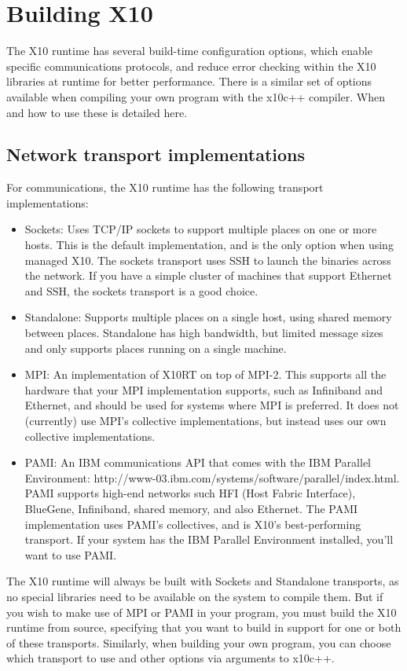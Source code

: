 \chapter{Building X10}
The X10 runtime has several build-time configuration options, which enable
specific communications protocols, and reduce error checking within the X10
libraries at runtime for better performance.  There is a similar set of options
available when compiling your own program with the x10c++ compiler.  When and
how to use these is detailed here.

\section{Network transport implementations}
For communications, the X10 runtime has the following transport
implementations:
\begin{itemize}
\item Sockets: Uses TCP/IP sockets to support multiple places on one or more
hosts.  This is the default implementation, and is the only option when using
managed X10.  The sockets transport uses SSH to launch the binaries across the
network.  If you have a simple cluster of machines that support Ethernet and
SSH, the sockets transport is a good choice.
\item Standalone: Supports multiple places on a single host, using shared
memory between places. Standalone has high bandwidth, but limited message sizes
and only supports places running on a single machine.
\item MPI: An implementation of X10RT on top of MPI-2. This supports all the
hardware that your MPI implementation supports, such as Infiniband and
Ethernet, and should be used for systems where MPI is preferred.  It does not
(currently) use MPI's collective implementations, but instead uses our own
collective implementations.
\item PAMI: An IBM communications API that comes with the IBM Parallel
Environment: http://www-03.ibm.com/systems/software/parallel/index.html.  PAMI
supports high-end networks such HFI (Host Fabric Interface), BlueGene,
Infiniband, shared memory, and also Ethernet.  The PAMI implementation uses
PAMI's collectives, and is X10's best-performing transport.  If your system has
the IBM Parallel Environment installed, you'll want to use PAMI.
\end{itemize}

The X10 runtime will always be built with Sockets and Standalone
transports, as no special libraries need to be available on the system to
compile them.  But if you wish to make use of MPI or PAMI in your program, you
must build the X10 runtime from source, specifying that you want to build in
support for one or both of these transports.  Similarly, when building your own
program, you can choose which transport to use and other options via arguments
to x10c++.

